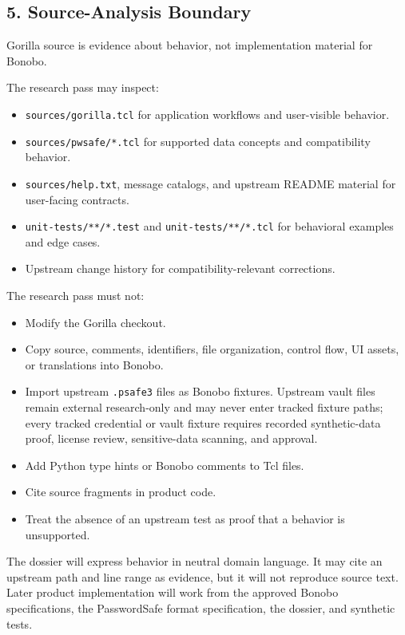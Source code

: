 \documentclass[
  letterpaper,
]{article}
\newcommand{\passthrough}[1]{#1}
\providecommand{\tightlist}{%
  \setlength{\itemsep}{0pt}\setlength{\parskip}{0pt}}
\begin{document}
\subsection{5. Source-Analysis Boundary}\label{5-source-analysis-boundary}

Gorilla source is evidence about behavior, not implementation material for Bonobo.

The research pass may inspect:

\begin{itemize}
\tightlist
\item
  \nolinkurl{sources/gorilla.tcl} for application workflows and user-visible behavior.
\item
  \nolinkurl{sources/pwsafe/*.tcl} for supported data concepts and compatibility behavior.
\item
  \nolinkurl{sources/help.txt}, message catalogs, and upstream README material for user-facing contracts.
\item
  \nolinkurl{unit-tests/**/*.test} and \nolinkurl{unit-tests/**/*.tcl} for behavioral examples and edge cases.
\item
  Upstream change history for compatibility-relevant corrections.
\end{itemize}

The research pass must not:

\begin{itemize}
\tightlist
\item
  Modify the Gorilla checkout.
\item
  Copy source, comments, identifiers, file organization, control flow, UI assets, or translations into Bonobo.
\item
  Import upstream \passthrough{\lstinline!.psafe3!} files as Bonobo fixtures. Upstream vault files remain external
  research-only and may never enter tracked fixture paths; every tracked credential or vault fixture requires recorded
  synthetic-data proof, license review, sensitive-data scanning, and approval.
\item
  Add Python type hints or Bonobo comments to Tcl files.
\item
  Cite source fragments in product code.
\item
  Treat the absence of an upstream test as proof that a behavior is unsupported.
\end{itemize}

The dossier will express behavior in neutral domain language. It may cite an upstream path and line range as evidence,
but it will not reproduce source text. Later product implementation will work from the approved Bonobo specifications,
the PasswordSafe format specification, the dossier, and synthetic tests.
\end{document}
